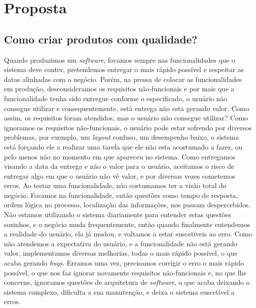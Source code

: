 \part{Proposta}
  \chapter{Como criar produtos com qualidade?}
    Quando produzimos um \textit{software}, focamos sempre nas funcionalidades que
    o sistema deve conter, pretendemos entregar o mais rápido possível e respeitar
    as datas alinhadas com o negócio. Porém, na pressa de colocar as funcionalidades
    em produção, desconsideramos os requisitos não-funcionais e por mais que a
    funcionalidade tenha sido entregue conforme o especificado, o usuário não
    consegue utilizar e consequentemente, está entrega não esta gerando valor. \newline
    Como assim, os requisitos foram atendidos, mas o usuário não consegue utilizar?
    Como ignoramos os requisitos não-funcionais, o usuário pode estar sofrendo por
    diversos problemas, por exemplo, um \textit{layout} confuso, um desempenho baixo,
    o sistema está forçando ele a realizar uma tarefa que ele não esta acostumado a
    fazer, ou pelo menos não no momento em que apareceu no sistema. Como entregamos
    visando a data da entrega e não o valor para o usuário, aceitamos o risco de
    entregar algo em que o usuário não vê valor, e por diversas vezes cometemos
    erros. Ao testar uma funcionalidade, não costumamos ter a visão total do negócio.
    Focamos na funcionalidade, então questões como tempo de resposta, ordem lógica
    no processo, localização das informações, nos passam despercebidos. Não estamos
    utilizando o sistema diariamente para entender estas questões sozinhos, e o
    negócio muda frequentemente, então quando finalmente entendemos a realidade do
    usuário, ela já mudou, e voltamos a estar suscetíveis ao erro. \newline
    Como não atendemos a expectativa do usuário, e a funcionalidade não está gerando
    valor, implementamos diversas melhorias, todas o mais rápido possível, o que
    acaba gerando \textit{bugs}. Erramos uma vez, precisamos corrigir o erro o mais
    rápido possível, o que nos faz ignorar novamente requisitos não-funcionais e,
    no que lhe concerne, ignoramos questões de arquitetura de \textit{software},
    o que acaba deixando o sistema complexo, dificulta a sua manutenção, e deixa
    o sistema suscetível a erros. \newline

